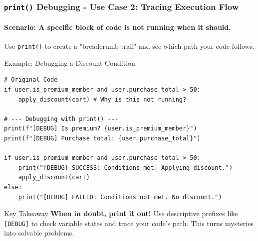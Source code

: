 \documentclass{beamer}
\begin{document}
\begin{frame}[fragile]
    \frametitle{\texttt{print()} Debugging - Use Case 2: Tracing Execution Flow}
    \framesubtitle{Scenario: A specific block of code is not running when it should.}
    \vspace{1em}
    Use \texttt{print()} to create a "breadcrumb trail" and see which path your code follows.

    \begin{block}{Example: Debugging a Discount Condition}
        \begin{verbatim}
# Original Code
if user.is_premium_member and user.purchase_total > 50:
    apply_discount(cart) # Why is this not running?

# --- Debugging with print() ---
print(f"[DEBUG] Is premium? {user.is_premium_member}")
print(f"[DEBUG] Purchase total: {user.purchase_total}")

if user.is_premium_member and user.purchase_total > 50:
    print("[DEBUG] SUCCESS: Conditions met. Applying discount.")
    apply_discount(cart)
else:
    print("[DEBUG] FAILED: Conditions not met. No discount.")
        \end{verbatim}
    \end{block}

    \begin{alertblock}{Key Takeaway}
        \textbf{When in doubt, print it out!} Use descriptive prefixes like \texttt{[DEBUG]} to check variable states and trace your code's path. This turns mysteries into solvable problems.
    \end{alertblock}
\end{frame}
\end{document}
